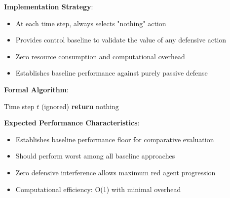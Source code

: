 \documentclass[12pt,oneside]{article}
\begin{document}
\textbf{Implementation Strategy}:
\begin{itemize}
    \item At each time step, always selects "nothing" action
    \item Provides control baseline to validate the value of any defensive action
    \item Zero resource consumption and computational overhead
    \item Establishes baseline performance against purely passive defense
\end{itemize}

\textbf{Formal Algorithm}:
\begin{algorithm}[H]
\caption{Inactive Control Baseline}
\label{alg:inactive_baseline}
\begin{algorithmic}[1]
\REQUIRE Time step $t$ (ignored)
\STATE \textbf{return} $\text{nothing}$ 
\end{algorithmic}
\end{algorithm}

\textbf{Expected Performance Characteristics}:
\begin{itemize}
    \item Establishes baseline performance floor for comparative evaluation
    \item Should perform worst among all baseline approaches
    \item Zero defensive interference allows maximum red agent progression
    \item Computational efficiency: O(1) with minimal overhead
\end{itemize}
\end{document}
